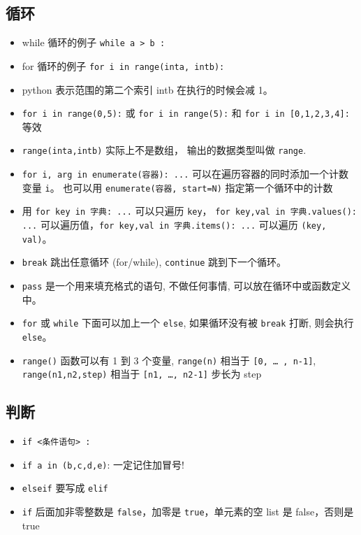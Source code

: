 \subsection{循环}
\begin{itemize}
\item while 循环的例子  \verb`while a > b :`
\item for 循环的例子 \verb`for i in range(inta, intb):`
\item python 表示范围的第二个索引 intb 在执行的时候会减 1。
\item \verb`for i in range(0,5):` 或 \verb`for i in range(5):` 和 \verb`for i in [0,1,2,3,4]:` 等效
\item \verb`range(inta,intb)` 实际上不是数组， 输出的数据类型叫做 \verb`range`.
\item \verb`for i, arg in enumerate(容器): ...` 可以在遍历容器的同时添加一个计数变量 \verb`i`。 也可以用 \verb`enumerate(容器, start=N)` 指定第一个循环中的计数
\item 用 \verb`for key in 字典: ...` 可以只遍历 \verb`key`， \verb`for key,val in 字典.values(): ...` 可以遍历值，\verb`for key,val in 字典.items(): ...` 可以遍历 \verb`(key, val)`。
\item \verb`break` 跳出任意循环 (for/while), \verb`continue` 跳到下一个循环。
\item \verb`pass` 是一个用来填充格式的语句, 不做任何事情, 可以放在循环中或函数定义中。
\item \verb`for` 或 \verb`while` 下面可以加上一个 \verb`else`, 如果循环没有被 \verb`break` 打断, 则会执行 \verb`else`。
\item \verb`range()` 函数可以有 1 到 3 个变量, \verb`range(n)` 相当于 \verb`[0, … , n-1]`, \verb`range(n1,n2,step)` 相当于 \verb`[n1, …, n2-1]` 步长为 step 
\end{itemize}

\subsection{判断}
\begin{itemize}
\item \verb`if <条件语句> :`
\item \verb`if a in (b,c,d,e)`:   一定记住加冒号!
\item \verb`elseif` 要写成 \verb`elif`
\item \verb`if` 后面加非零整数是 \verb`false`，加零是 \verb`true`，单元素的空 list 是 false，否则是 true
\end{itemize}


